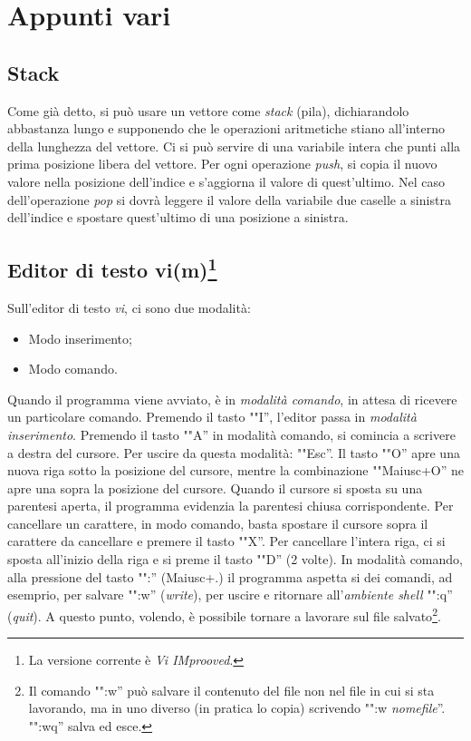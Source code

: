 \chapter{Appunti vari}
	\section{Stack}
	\label{sec:vari:stack}
Come già detto, si può usare un vettore come \emph{stack} (pila), dichiarandolo abbastanza lungo e supponendo che le operazioni aritmetiche stiano all'interno della lunghezza del vettore. Ci si può servire di una variabile intera che punti alla prima posizione libera del vettore. Per ogni operazione \emph{push}, si copia il nuovo valore nella posizione dell'indice e s'aggiorna il valore di quest'ultimo. Nel caso dell'operazione \emph{pop} si dovrà leggere il valore della variabile due caselle a sinistra dell'indice e spostare quest'ultimo di una posizione a sinistra.

	\section[Editor di testo \textsf{vi(m)}]{Editor di testo vi(m)\protect\footnote{{L}a versione corrente è \emph{Vi IMprooved}.}}
Sull'editor di testo \emph{vi}, ci sono due modalità:
\begin{itemize}
	\item Modo inserimento;
	\item Modo comando.
\end{itemize}

Quando il programma viene avviato, è in \emph{modalità comando}, in attesa di ricevere un particolare comando. Premendo il tasto ""I'', l'editor passa in \emph{modalità inserimento}. Premendo il tasto ""A'' in modalità comando, si comincia a scrivere a destra del cursore. Per uscire da questa modalità: ""Esc''. Il tasto ""O'' apre una nuova riga sotto la posizione del cursore, mentre la combinazione ""Maiusc+O'' ne apre una sopra la posizione del cursore. Quando il cursore si sposta su una parentesi aperta, il programma evidenzia la parentesi chiusa corrispondente. Per cancellare un carattere, in modo comando, basta spostare il cursore sopra il carattere da cancellare e premere il tasto ""X''. Per cancellare l'intera riga, ci si sposta all'inizio della riga e si preme il tasto ""D'' (2 volte). In modalità comando, alla pressione del tasto "":'' (Maiusc+.) il programma aspetta si dei comandi, ad esemprio, per salvare "":w'' (\emph{write}), per uscire e ritornare all'\emph{ambiente shell} "":q'' (\emph{quit}). A questo punto, volendo, è possibile tornare a lavorare sul file salvato\footnote{Il comando "":w'' può salvare il contenuto del file non nel file in cui si sta lavorando, ma in uno diverso (in pratica lo copia) scrivendo "":w \emph{nomefile}''. "":wq'' salva ed esce.}.

